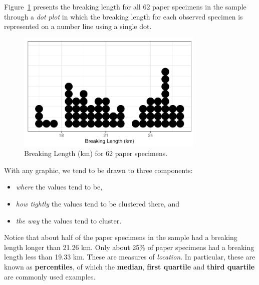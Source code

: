 \documentclass[
  letterpaper,
  DIV=11,
  numbers=noendperiod]{scrreprt}
\providecommand{\tightlist}{%
  \setlength{\itemsep}{0pt}\setlength{\parskip}{0pt}}\usepackage{longtable,booktabs,array}
\theoremstyle{definition}
\theoremstyle{definition}
\theoremstyle{plain}
\theoremstyle{remark}
\begin{document}
Figure~\ref{fig-summaries-paper-dotplot} presents the breaking length
for all 62 paper specimens in the sample through a \emph{dot plot} in
which the breaking length for each observed specimen is represented on a
number line using a single dot.

\begin{figure}

{\centering \includegraphics[width=0.8\textwidth,height=\textheight]{./images/fig-summaries-paper-dotplot-1.pdf}

}

\caption{\label{fig-summaries-paper-dotplot}Breaking Length (km) for 62
paper specimens.}

\end{figure}

With any graphic, we tend to be drawn to three components:

\begin{itemize}
\tightlist
\item
  \emph{where} the values tend to be,
\item
  \emph{how tightly} the values tend to be clustered there, and
\item
  \emph{the way} the values tend to cluster.
\end{itemize}

Notice that about half of the paper specimens in the sample had a
breaking length longer than 21.26 km. Only about 25\% of paper specimens
had a breaking length less than 19.33 km. These are measures of
\emph{location}. In particular, these are known as \textbf{percentiles},
of which the \textbf{median}, \textbf{first quartile} and \textbf{third
quartile} are commonly used examples.
\end{document}
